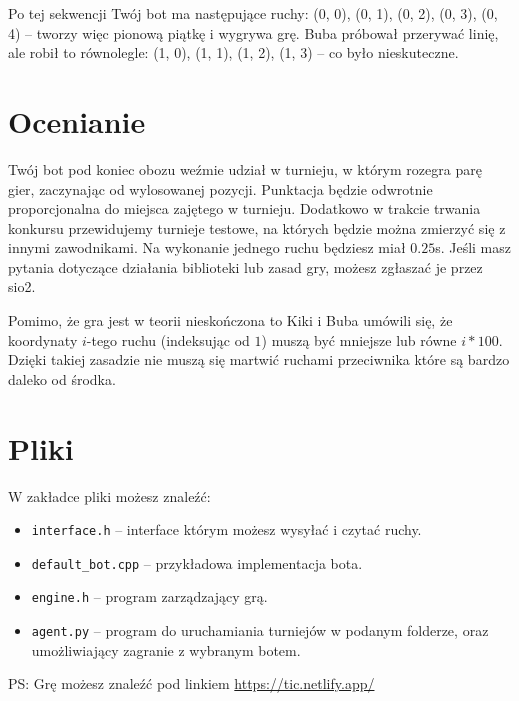\documentclass{spiral}
\begin{document}
\bigskip

\noindent
\noindent Po tej sekwencji Twój bot ma następujące ruchy: (0, 0), (0, 1), (0,
2), (0, 3), (0, 4) – tworzy więc pionową piątkę i wygrywa grę. Buba próbował
przerywać linię, ale robił to równolegle: (1, 0), (1, 1), (1, 2),
(1, 3) – co było nieskuteczne.


\section{Ocenianie}
\noindent Twój bot pod koniec obozu weźmie udział w turnieju, w którym rozegra
parę gier, zaczynając od wylosowanej pozycji. Punktacja będzie odwrotnie
proporcjonalna do miejsca zajętego w turnieju. Dodatkowo w trakcie trwania
konkursu przewidujemy turnieje testowe, na których będzie można zmierzyć się z
innymi zawodnikami. Na wykonanie jednego ruchu będziesz miał $0.25$s. Jeśli
masz pytania dotyczące działania biblioteki lub zasad gry, możesz zgłaszać je
przez sio2.

\noindent Pomimo, że gra jest w teorii nieskończona to Kiki i Buba umówili się,
że koordynaty $i$-tego ruchu (indeksując od $1$) muszą być mniejsze lub równe
$i * 100$. Dzięki takiej zasadzie nie muszą się martwić ruchami przeciwnika
które są bardzo daleko od środka.

\section{Pliki}
\noindent
W zakładce pliki możesz znaleźć:
\begin{itemize}
	\item \texttt{interface.h} – interface którym możesz wysyłać i czytać
	      ruchy.
	\item \texttt{default\_bot.cpp} – przykładowa implementacja bota.
	\item \texttt{engine.h} – program zarządzający grą.
	\item \texttt{agent.py} – program do uruchamiania turniejów w podanym
	      folderze, oraz umożliwiający zagranie z wybranym botem.

\end{itemize}

\vfill
\noindent PS: Grę możesz znaleźć pod linkiem
\href{https://tic.netlify.app/}{https://tic.netlify.app/}
\end{document}
